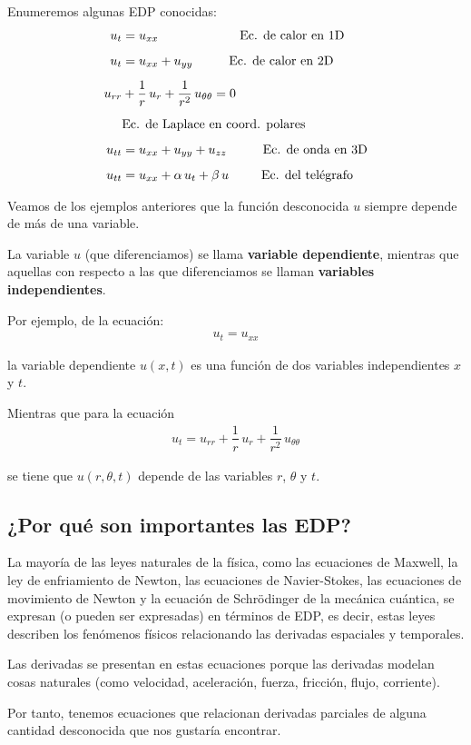 Enumeremos algunas EDP conocidas:
\begin{align*}
u_{t} &= u_{xx} \hspace{2.25cm} \mbox{Ec. de calor en 1D} \\[0.5em] 
u_{t} &= u_{xx} + u_{yy} \hspace{1cm} \mbox{Ec. de calor en 2D} \\[0.5em] 
u_{rr} &+ \dfrac{1}{r} \, u_{r} + \dfrac{1}{r^{2}} \, u_{\theta \theta} = 0 \\[0.5em]
&{} \mbox{Ec. de Laplace en coord. polares} \\[0.5em]
u_{tt} &= u_{xx} + u_{yy} + u_{zz} \hspace{1cm} \mbox{Ec. de onda en 3D} \\[0.5em] 
u_{tt} &= u_{xx} + \alpha \, u_{t} + \beta \, u \hspace{0.9cm} \mbox{Ec. del telégrafo}
\end{align*}

Veamos de los ejemplos anteriores que la función desconocida $u$ siempre depende de más de una variable.
\par
La variable $u$ (que diferenciamos) se llama \textbf{variable dependiente}, mientras que aquellas con respecto a las que diferenciamos se llaman \textbf{variables independientes}.
\par
Por ejemplo, de la ecuación:
\begin{align*}
u_{t} = u_{xx}
\end{align*}

la variable dependiente $u(x, t)$ es una función de dos variables independientes $x$ y $t$.

Mientras que para la ecuación
\begin{align*}
u_{t} = u_{rr} + \dfrac{1}{r} \, u_{r} + \dfrac{1}{r^{2}} \, u_{\theta \theta}
\end{align*}

se tiene que $u(r, \theta, t)$ depende de las variables $r$, $\theta$ y $t$.

\subsection{¿Por qué son importantes las EDP?}

La mayoría de las leyes naturales de la física, como las ecuaciones de Maxwell, la ley de enfriamiento de Newton, las ecuaciones de Navier-Stokes, las ecuaciones de movimiento de Newton y la ecuación de Schrödinger de la mecánica cuántica, se expresan (o pueden ser expresadas) en términos de EDP, es decir, estas leyes describen los fenómenos físicos relacionando las derivadas espaciales y temporales.
\par
Las derivadas se presentan en estas ecuaciones porque las derivadas modelan cosas naturales (como velocidad, aceleración, fuerza, fricción, flujo, corriente). 
\par
Por tanto, tenemos ecuaciones que relacionan derivadas parciales de alguna cantidad desconocida que nos gustaría encontrar.

